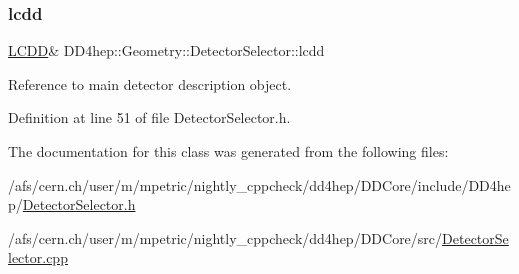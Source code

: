 \subsubsection{\texorpdfstring{lcdd}{lcdd}}
{\footnotesize\ttfamily \hyperlink{class_d_d4hep_1_1_geometry_1_1_l_c_d_d}{L\+C\+DD}\& D\+D4hep\+::\+Geometry\+::\+Detector\+Selector\+::lcdd}



Reference to main detector description object. 



Definition at line 51 of file Detector\+Selector.\+h.



The documentation for this class was generated from the following files\+:\begin{DoxyCompactItemize}
\item 
/afs/cern.\+ch/user/m/mpetric/nightly\+\_\+cppcheck/dd4hep/\+D\+D\+Core/include/\+D\+D4hep/\hyperlink{_detector_selector_8h}{Detector\+Selector.\+h}\item 
/afs/cern.\+ch/user/m/mpetric/nightly\+\_\+cppcheck/dd4hep/\+D\+D\+Core/src/\hyperlink{_detector_selector_8cpp}{Detector\+Selector.\+cpp}\end{DoxyCompactItemize}
